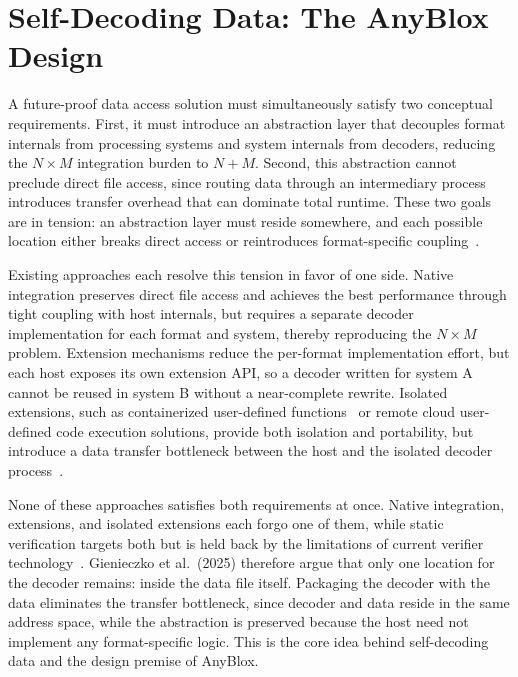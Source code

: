 \section{Self-Decoding Data: The AnyBlox Design}

A future-proof data access solution must simultaneously satisfy two conceptual requirements. First, it must introduce an abstraction layer that decouples format internals from processing systems and system internals from decoders, reducing the $N \times M$ integration burden to $N + M$. Second, this abstraction cannot preclude direct file access, since routing data through an intermediary process introduces transfer overhead that can dominate total runtime. These two goals are in tension: an abstraction layer must reside somewhere, and each possible location either breaks direct access or reintroduces format-specific coupling~\cite{gienieczkoAnyBloxFrameworkSelfDecoding2025}.

Existing approaches each resolve this tension in favor of one side. Native integration preserves direct file access and achieves the best performance through tight coupling with host internals, but requires a separate decoder implementation for each format and system, thereby reproducing the $N \times M$ problem. Extension mechanisms reduce the per-format implementation effort, but each host exposes its own extension API, so a decoder written for system A cannot be reused in system B without a near-complete rewrite. Isolated extensions, such as containerized user-defined functions~\cite{saurContainerizedExecutionUDFs2022a} or remote cloud user-defined code execution solutions, provide both isolation and portability, but introduce a data transfer bottleneck between the host and the isolated decoder process~\cite{gienieczkoAnyBloxFrameworkSelfDecoding2025}.

None of these approaches satisfies both requirements at once. Native integration, extensions, and isolated extensions each forgo one of them, while static verification targets both but is held back by the limitations of current verifier technology~\cite{gienieczkoAnyBloxFrameworkSelfDecoding2025}. Gienieczko et al.\ (2025) therefore argue that only one location for the decoder remains: inside the data file itself. Packaging the decoder with the data eliminates the transfer bottleneck, since decoder and data reside in the same address space, while the abstraction is preserved because the host need not implement any format-specific logic. This is the core idea behind self-decoding data and the design premise of AnyBlox.



